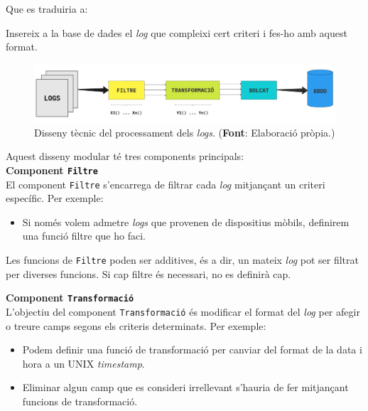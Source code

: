 \noindent
Que es traduiria a:
\begin{center}
    Insereix a la base de dades el \textit{\gls{log}} que compleixi cert criteri i fes-ho amb aquest format.
\end{center}

\begin{figure}[htbp]
    \centerline{\includegraphics[width=1\textwidth]{figures/log-processing}}
    \captionsetup{justification=centering}
    \caption[Disseny tècnic del processament dels \textit{logs}.]{Disseny tècnic del processament dels \textit{logs}. (\textbf{Font}: Elaboració pròpia.)}\label{fig:log-processing}
\end{figure}

\noindent
Aquest disseny modular té tres components principals: \\

\noindent
\textbf{Component \texttt{Filtre}} \\

\noindent
El component \texttt{Filtre} s’encarrega de filtrar cada \textit{\gls{log}} mitjançant un criteri específic.
Per exemple:
\begin{itemize}
    \item Si només volem admetre \textit{\gls{log}s} que provenen de dispositius mòbils, definirem una funció filtre que ho faci.
\end{itemize}

\noindent
Les funcions de \texttt{Filtre} poden ser additives, és a dir, un mateix \textit{\gls{log}} pot ser filtrat per diverses funcions.
Si cap filtre és necessari, no es definirà cap. \\

\clearpage

\noindent
\textbf{Component \texttt{Transformació}} \\

\noindent
L’objectiu del component \texttt{Transformació} és modificar el format del \textit{\gls{log}} per afegir o treure camps segons els criteris determinats.
Per exemple:

\begin{itemize}
    \item Podem definir una funció de transformació per canviar del format de la data i hora a un UNIX \textit{\gls{timestamp}}.
    \item Eliminar algun camp que es consideri irrellevant s’hauria de fer mitjançant funcions de transformació.
\end{itemize}

